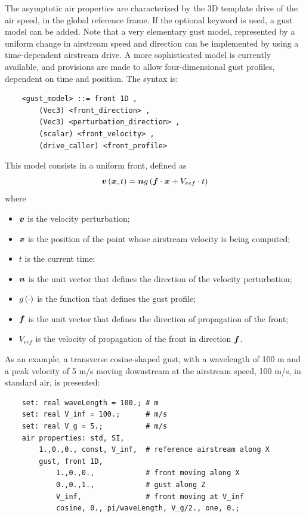 The asymptotic air properties are characterized by the 3D template drive 
of the air speed, in the global reference frame.
If the optional  keyword is used, a gust model can be added.
Note that a very elementary gust model, represented by a uniform change
in airstream speed and direction can be implemented by using
a time-dependent airstream drive.
A more sophisticated model is currently available, and provisions are
made to allow four-dimensional gust profiles, dependent on time
and position.
The syntax is:
\begin{verbatim}
    <gust_model> ::= front 1D ,
        (Vec3) <front_direction> ,
        (Vec3) <perturbation_direction> ,
        (scalar) <front_velocity> ,
        (drive_caller) <front_profile>
\end{verbatim}
This model consists in a uniform front, defined as
\begin{displaymath}
	\boldsymbol{v}\left( \boldsymbol{x}, t \right) = \boldsymbol{n} g\left( \boldsymbol{f} \cdot \boldsymbol{x} + V_{ref} \cdot t \right)
\end{displaymath}
where
\begin{itemize}
\item $\boldsymbol{v}$ is the velocity perturbation;
\item $\boldsymbol{x}$ is the position of the point whose airstream velocity
is being computed;
\item $t$ is the current time;
\item $\boldsymbol{n}$ is the unit vector  
that defines the direction of the velocity perturbation;
\item $g\left( \cdot \right)$ is the function  
that defines the gust profile;
\item $\boldsymbol{f}$ is the unit vector  
that defines the direction of propagation of the front;
\item $V_{ref}$ is the velocity  
of propagation of the front in direction $\boldsymbol{f}$.
\end{itemize}
As an example, a transverse cosine-shaped gust, with a wavelength of 100 m
and a peak velocity of 5 m/s moving downstream at the airstream speed,
100 m/s, in standard air, is presented:
\begin{verbatim}
    set: real waveLength = 100.; # m
    set: real V_inf = 100.;      # m/s
    set: real V_g = 5.;          # m/s
    air properties: std, SI,
        1.,0.,0., const, V_inf,  # reference airstream along X
        gust, front 1D,
            1.,0.,0.,            # front moving along X
            0.,0.,1.,            # gust along Z
            V_inf,               # front moving at V_inf
            cosine, 0., pi/waveLength, V_g/2., one, 0.;
\end{verbatim}

